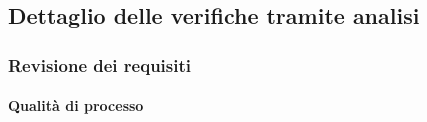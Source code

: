 	
	
	\newpage
\subsection{Dettaglio delle verifiche tramite analisi}

	\subsubsection{Revisione dei requisiti}
		\paragraph{Qualità di processo}

